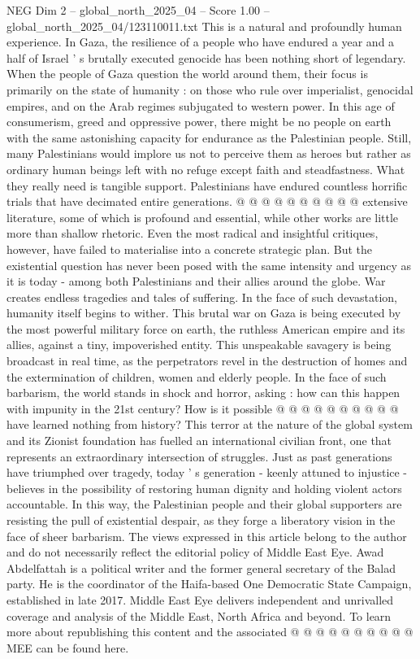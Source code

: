 \begin{textsample}{NEG Dim 2 – global\_north\_2025\_04 – Score 1.00 – global\_north\_2025\_04/123110011.txt}
This is a natural and profoundly human experience.
In Gaza, the resilience of a people who have endured a year and a half of Israel ' s brutally executed genocide has been nothing short of legendary.
When the people of Gaza question the world around them, their focus is primarily on the state of humanity : on those who rule over imperialist, genocidal empires, and on the Arab regimes subjugated to western power.
In this age of consumerism, greed and oppressive power, there might be no people on earth with the same astonishing capacity for endurance as the Palestinian people.
Still, many Palestinians would implore us not to perceive them as heroes but rather as ordinary human beings left with no refuge except faith and steadfastness.
What they really need is tangible support.
Palestinians have endured countless horrific trials that have decimated entire generations. @ @ @ @ @ @ @ @ @ @ extensive literature, some of which is profound and essential, while other works are little more than shallow rhetoric.
Even the most radical and insightful critiques, however, have failed to materialise into a concrete strategic plan.
But the existential question has never been posed with the same intensity and urgency as it is today - among both Palestinians and their allies around the globe.
War creates endless tragedies and tales of suffering.
In the face of such devastation, humanity itself begins to wither.
This brutal war on Gaza is being executed by the most powerful military force on earth, the ruthless American empire and its allies, against a tiny, impoverished entity.
This unspeakable savagery is being broadcast in real time, as the perpetrators revel in the destruction of homes and the extermination of children, women and elderly people.
In the face of such barbarism, the world stands in shock and horror, asking : how can this happen with impunity in the 21st century?
How is it possible @ @ @ @ @ @ @ @ @ @ have learned nothing from history?
This terror at the nature of the global system and its Zionist foundation has fuelled an international civilian front, one that represents an extraordinary intersection of struggles.
Just as past generations have triumphed over tragedy, today ' s generation - keenly attuned to injustice - believes in the possibility of restoring human dignity and holding violent actors accountable.
In this way, the Palestinian people and their global supporters are resisting the pull of existential despair, as they forge a liberatory vision in the face of sheer barbarism.
The views expressed in this article belong to the author and do not necessarily reflect the editorial policy of Middle East Eye.
Awad Abdelfattah is a political writer and the former general secretary of the Balad party.
He is the coordinator of the Haifa-based One Democratic State Campaign, established in late 2017.
Middle East Eye delivers independent and unrivalled coverage and analysis of the Middle East, North Africa and beyond.
To learn more about republishing this content and the associated @ @ @ @ @ @ @ @ @ @ MEE can be found here.

\end{textsample}
